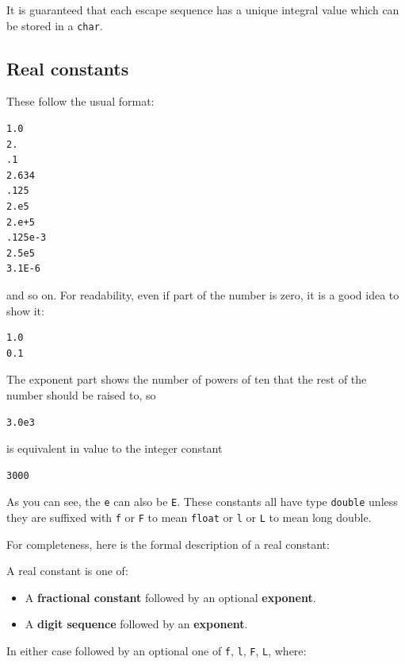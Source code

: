    It is guaranteed that each escape sequence has a unique integral value
    which can be stored in a \texttt{char}.


  

  \subsection{Real constants}
   

   These follow the usual format:


   \begin{Verbatim}
1.0
2.
.1
2.634
.125
2.e5
2.e+5
.125e-3
2.5e5
3.1E-6
\end{Verbatim}

   and so on. For readability, even if part of the number is zero, it is a
    good idea to show it:


   \begin{Verbatim}
1.0
0.1
\end{Verbatim}

   The exponent part shows the number of powers of ten that the rest of the
    number should be raised to, so


   \begin{Verbatim}
3.0e3
\end{Verbatim}

   is equivalent in value to the integer constant


   \begin{Verbatim}
3000
\end{Verbatim}

   As you can see, the \texttt{e} can also be \texttt{E}.
    These constants all have type \texttt{double} unless they are suffixed
    with \texttt{f} or \texttt{F} to mean \texttt{float}
    or \texttt{l} or \texttt{L} to mean long double.


   For completeness, here is the formal description of a real constant:


   A real constant is one of:


   \begin{itemize}
    \item A \textbf{fractional constant} followed by an optional
     \textbf{exponent}.
    \item A \textbf{digit sequence} followed by an \textbf{exponent}.
   \end{itemize}

   In either case followed by an optional one of \texttt{f},
    \texttt{l}, \texttt{F}, \texttt{L}, where:


